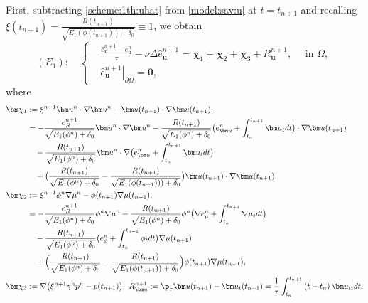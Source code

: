 First, subtracting \eqref{scheme:1th:uhat} from \eqref{model:sav:u} at $t=t_{n+1}$ and recalling $\xi(t_{n+1})=\frac{R(t_{n+1})}{\sqrt{E_1(\phi(t_{n+1}))+\delta_0}}\equiv 1$, we obtain
\begin{equation*} 
	(E_1): \quad  \left\{
	\begin{aligned}
		& \frac{\widehat{e}_{\bm u}^{n+1}-e_{\bm u}^{n}}{\tau}-\nu \Delta \widehat{e}_{\bm u}^{n+1}  = \bm \chi_1 +\bm \chi_2 + \bm \chi_3 +R_{\bm u}^{n+1}, 
		\quad \text { in } \Omega, \\ 
		& \left. \widehat{e}_{\bm u}^{n+1}\right|_{\partial \Omega}=\mathbf{0},
	\end{aligned}\right. 
\end{equation*}
where  
\begin{equation*}
	\begin{aligned}
		\bm \chi_1 & := \xi^{n+1}\bm u^n \cdot \nabla \bm u^n - \bm u(t_{n + 1}) \cdot \nabla \bm u(t_{n+1}), \\ 
		& = -\frac{e_R^{n+1}}{\sqrt{E_1(\phi^n)+\delta_0}} \bm u^n \cdot \nabla \bm u^n- \frac{R(t_{n+1})}{\sqrt{E_1(\phi^n)+\delta_0}} \big(e_{\bm u}^n +\int_{t_n}^{t_{n+1}} \bm u_t d t\big) \cdot \nabla \bm u(t_{n + 1})  \\
		& \quad - \frac{R(t_{n+1})}{\sqrt{E_1(\phi^n)+\delta_0}} \bm u^n \cdot \nabla \big(e_{\bm u}^n +\int_{t_n}^{t_{n+1}} \bm u_t d t\big) \\
		& \quad + \big(\frac{R(t_{n+1})}{\sqrt{E_1(\phi^n)+\delta_0}} - \frac{R(t_{n+1})}{\sqrt{E_1(\phi(t_{n+1})))+\delta_0}} \big) \bm u(t_{n + 1}) \cdot \nabla \bm u(t_{n+1}), \\
		\bm \chi_2  &:= \xi^{n+1} \phi^n  \nabla  \mu^n - \phi(t_{n+1}) \nabla \mu(t_{n+1}), \\
		& = - \frac{e_R^{n+1}}{\sqrt{E_1(\phi^n)+\delta_0}} \phi^n \nabla \mu^n  -\frac{R(t_{n+1}) }{\sqrt{E_1(\phi^n)+\delta_0}}  \phi^n \big(\nabla  e_\mu^n+ \int_{t_n}^{t_{n+1}} \nabla \mu_t dt\big) \\
		& \quad -\frac{R(t_{n+1}) }{\sqrt{E_1(\phi^n)+\delta_0}} \big(e_\phi^n +\int_{t_n}^{t_{n+1}}\phi_t dt \big)\nabla \mu(t_{n+1})  \\
		& \quad  +  \Big( \frac{R(t_{n+1})}{\sqrt{E_1(\phi^n)+\delta_0}}-\frac{R(t_{n+1})}{\sqrt{E_1(\phi(t_{n+1}))+\delta_0}}\Big) \phi(t_{n+1}) \nabla \mu(t_{n+1}),\\
		\bm \chi_3 &:=  \nabla \big(\xi^{n+1} \gamma^n p^n-p(t_{n+1})\big),\
		R_{\bm u}^{n+1}:=\p_{\tau} \bm u(t_{n+1}) - \bm u_t(t_{n+1})=\frac{1}{\tau} \int_{t_n}^{t_{n+1}}\left(t-t_n\right) \bm u_{tt} d t.
	\end{aligned}
\end{equation*}

